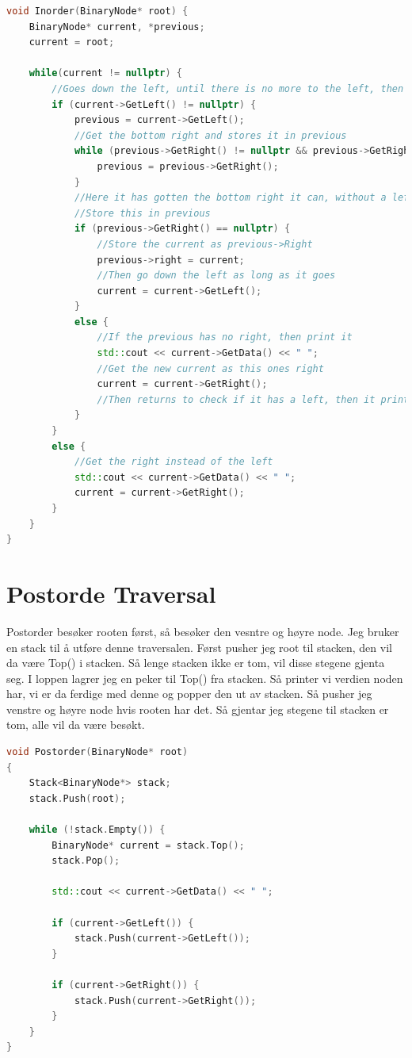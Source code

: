 \documentclass[a4paper,norsk]{article}
\begin{document}
\begin{lstlisting}[language=C++, caption={Oblig2.cpp}]
void Inorder(BinaryNode* root) {
    BinaryNode* current, *previous;
    current = root;

    while(current != nullptr) {
        //Goes down the left, until there is no more to the left, then goes down right until there is no more
        if (current->GetLeft() != nullptr) {
            previous = current->GetLeft();
            //Get the bottom right and stores it in previous
            while (previous->GetRight() != nullptr && previous->GetRight() != current) {
                previous = previous->GetRight();
            }
            //Here it has gotten the bottom right it can, without a left
            //Store this in previous 
            if (previous->GetRight() == nullptr) {
                //Store the current as previous->Right
                previous->right = current;
                //Then go down the left as long as it goes
                current = current->GetLeft();
            }
            else {
                //If the previous has no right, then print it
                std::cout << current->GetData() << " ";
                //Get the new current as this ones right
                current = current->GetRight();
                //Then returns to check if it has a left, then it prints it
            }
        }
        else {
            //Get the right instead of the left
            std::cout << current->GetData() << " ";
            current = current->GetRight();
        }
    }
}
\end{lstlisting}


\section{Postorde Traversal}
Postorder besøker rooten først, så besøker den vesntre og høyre node. 
Jeg bruker en stack til å utføre denne traversalen.
Først pusher jeg root til stacken, den vil da være Top() i stacken. Så lenge stacken ikke er tom, vil disse stegene gjenta seg.
I loppen lagrer jeg en peker til Top() fra stacken. Så printer vi verdien noden har, vi er da ferdige med denne og popper den ut av stacken.
Så pusher jeg venstre og høyre node hvis rooten har det. Så gjentar jeg stegene til stacken er tom, alle vil da være besøkt. 
\begin{lstlisting}[language=C++, caption={Oblig2.cpp}]
void Postorder(BinaryNode* root)
{
    Stack<BinaryNode*> stack;
    stack.Push(root);

    while (!stack.Empty()) {
        BinaryNode* current = stack.Top();
        stack.Pop();

        std::cout << current->GetData() << " ";

        if (current->GetLeft()) {
            stack.Push(current->GetLeft());
        }

        if (current->GetRight()) {
            stack.Push(current->GetRight());
        }
    }
}
\end{lstlisting}
\end{document}
